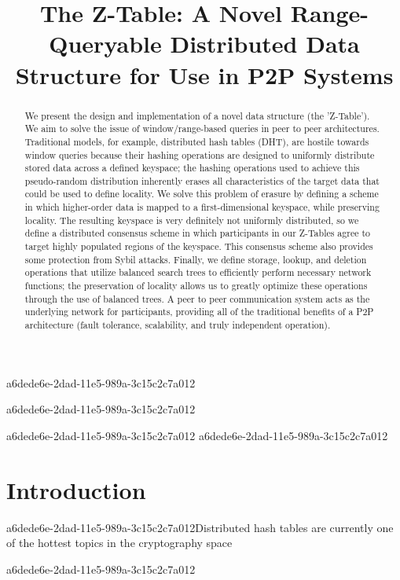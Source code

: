 \documentclass[12pt]{article}
\title{The Z-Table: A Novel Range-Queryable Distributed Data Structure for Use in P2P Systems}
\begin{document}
a6dede6e-2dad-11e5-989a-3c15c2c7a012
\maketitle
a6dede6e-2dad-11e5-989a-3c15c2c7a012
\begin{abstract}
We present the design and implementation of a novel data structure (the 'Z-Table'). We aim to solve the issue of window/range-based queries in peer to peer architectures. Traditional models, for example,  distributed hash tables (DHT), are hostile towards window queries because their hashing operations are designed to uniformly distribute stored data across a defined keyspace; the hashing operations used to achieve this pseudo-random distribution inherently erases all characteristics of the target data that could be used to define locality. We solve this problem of erasure by defining a scheme in which higher-order data is mapped to a first-dimensional keyspace, while preserving locality. The resulting keyspace is very definitely not uniformly distributed, so we define a distributed consensus scheme in which participants in our Z-Tables agree to target highly populated regions of the keyspace. This consensus scheme also provides some protection from Sybil attacks. Finally, we define storage, lookup, and deletion operations that utilize balanced search trees to efficiently perform necessary network functions; the preservation of locality allows us to greatly optimize these operations through the use of balanced trees. A peer to peer communication system acts as the underlying network for participants, providing all of the traditional benefits of a P2P architecture (fault tolerance, scalability, and truly independent operation).
\end{abstract}
a6dede6e-2dad-11e5-989a-3c15c2c7a012
a6dede6e-2dad-11e5-989a-3c15c2c7a012
\newpage
\section{Introduction}
a6dede6e-2dad-11e5-989a-3c15c2c7a012Distributed hash tables are currently one of the hottest topics in the cryptography space~\cite{Stoica:2001dj,Rowstron:2001ea,Ratnasamy:2001wn}

a6dede6e-2dad-11e5-989a-3c15c2c7a012\printbibliography
\end{document}
